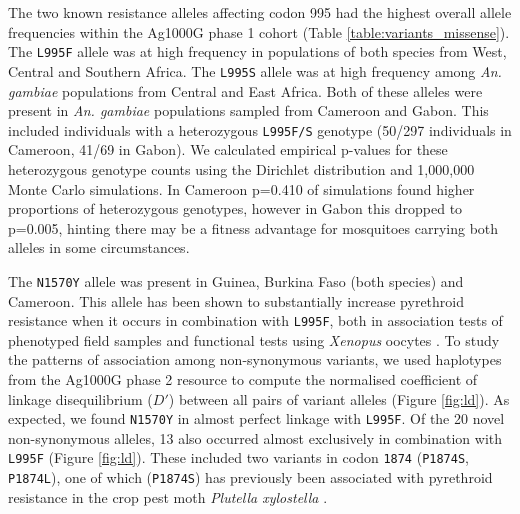 \documentclass[a4paper,11pt,abstracton,hidelinks]{scrartcl}
\begin{document}
{\begin{landscape}
\begin{table}[h]
\begin{threeparttable}
\begin{tablenotes}
  \end{tablenotes}

  \end{threeparttable}

\end{table}
\end{landscape}
\restoregeometry
} %


The two known resistance alleles affecting codon 995 had the highest overall allele frequencies within the Ag1000G phase 1 cohort (Table \ref{table:variants_missense}).
%
The \texttt{L995F} allele was at high frequency in populations of both species from West, Central and Southern Africa.
%
The \texttt{L995S} allele was at high frequency among \textit{An. gambiae} populations from Central and East Africa.
%
Both of these alleles were present in \textit{An. gambiae} populations sampled from Cameroon and Gabon.
%
This included individuals with a heterozygous \texttt{L995F/S} genotype (50/297 individuals in Cameroon, 41/69 in Gabon).
%
We calculated empirical p-values for these heterozygous genotype counts using the Dirichlet distribution and 1,000,000 Monte Carlo simulations.
%
In Cameroon p=0.410 of simulations found higher proportions of heterozygous genotypes, however in Gabon this dropped to p=0.005, hinting there may be a fitness advantage for mosquitoes carrying both alleles in some circumstances.
%


%
The \texttt{N1570Y} allele was present in Guinea, Burkina Faso (both species) and Cameroon.
%
This allele has been shown to substantially increase pyrethroid resistance when it occurs in combination with \texttt{L995F}, both in association tests of phenotyped field samples \cite{Jones2012} and functional tests using \textit{Xenopus} oocytes \cite{Wang2015}.
%
To study the patterns of association among non-synonymous variants, we used haplotypes from the Ag1000G phase 2 resource to compute the normalised coefficient  of linkage disequilibrium ($D'$) between all pairs of variant alleles (Figure \ref{fig:ld}).
%
As expected, we found \texttt{N1570Y} in almost perfect linkage with \texttt{L995F}.
%
Of the 20 novel non-synonymous alleles, 13 also occurred almost exclusively in combination with \texttt{L995F} (Figure \ref{fig:ld}).
%
These included two variants in codon \texttt{1874} (\texttt{P1874S}, \texttt{P1874L}), one of which (\texttt{P1874S}) has previously been associated with pyrethroid resistance in the crop pest moth \textit{Plutella xylostella} \cite{Sonoda2008}.
\end{document}
